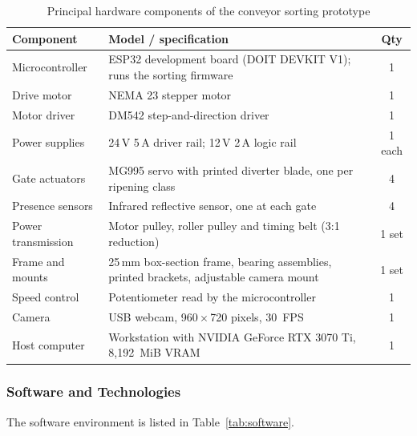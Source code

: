 \begin{table}[H]
\caption{Principal hardware components of the conveyor sorting prototype}
\label{tab:hardware}
\centering
\begin{tabularx}{\textwidth}{p{3.0cm} X c}
\toprule
\textbf{Component} & \textbf{Model / specification} & \textbf{Qty} \\
\midrule
Microcontroller & ESP32 development board (DOIT DEVKIT V1); runs the sorting firmware & 1 \\
Drive motor & NEMA 23 stepper motor & 1 \\
Motor driver & DM542 step-and-direction driver & 1 \\
Power supplies & 24\,V 5\,A driver rail; 12\,V 2\,A logic rail & 1 each \\
Gate actuators & MG995 servo with printed diverter blade, one per ripening class & 4 \\
Presence sensors & Infrared reflective sensor, one at each gate & 4 \\
Power transmission & Motor pulley, roller pulley and timing belt (3:1 reduction) & 1 set \\
Frame and mounts & 25\,mm box-section frame, bearing assemblies, printed brackets, adjustable camera mount & 1 set \\
Speed control & Potentiometer read by the microcontroller & 1 \\
Camera & \acrshort{USB} webcam, 960\,$\times$\,720 pixels, 30~\acrshort{FPS} & 1 \\
Host computer & Workstation with NVIDIA GeForce RTX 3070 Ti, 8{,}192~\acrshort{MiB} \acrshort{VRAM} & 1 \\
\bottomrule
\end{tabularx}
\end{table}

\subsubsection{Software and Technologies}
\label{sec:m_software}

The software environment is listed in Table~\ref{tab:software}.

